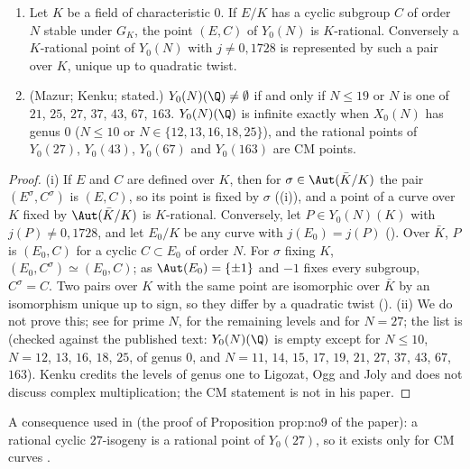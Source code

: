 \begin{proposition}\label{prop:moddeg:rational-points}
\leavevmode
\begin{enumerate}[label=(\roman*)]
\item Let $K$ be a field of characteristic $0$. If $E/K$ has a cyclic subgroup $C$ of order $N$ stable under $G_K$, the point $(E,C)$ of $Y_0(N)$ is
$K$-rational. Conversely a $K$-rational point of $Y_0(N)$ with $j\ne0,1728$ is represented by such a pair over $K$, unique up to quadratic twist.
\item (Mazur; Kenku; stated.) $Y_0(N)(\Q)\ne\emptyset$ if and only if $N\le19$ or $N$ is one of $21$, $25$, $27$, $37$, $43$, $67$, $163$. $Y_0(N)(\Q)$ is infinite exactly when $X_0(N)$
has genus $0$ ($N\le10$ or $N\in\{12,13,16,18,25\}$), and the rational points of $Y_0(27)$, $Y_0(43)$, $Y_0(67)$ and $Y_0(163)$ are CM points.
\end{enumerate}
\end{proposition}

\begin{proof}
(i) If $E$ and $C$ are defined over $K$, then for $\sigma\in\Aut(\bar K/K)$ the pair $(E^\sigma,C^\sigma)$ is $(E,C)$, so its point is fixed by $\sigma$
((i)), and a point of a curve over $K$ fixed by $\Aut(\bar K/K)$ is $K$-rational. Conversely, let $P\in Y_0(N)(K)$ with
$j(P)\ne0,1728$, and let $E_0/K$ be any curve with $j(E_0)=j(P)$ (). Over $\bar K$, $P$ is $(E_0,C)$ for a cyclic $C\subset E_0$ of order $N$.
For $\sigma$ fixing $K$, $(E_0,C^\sigma)\simeq(E_0,C)$; as $\Aut(E_0)=\{\pm1\}$ and $-1$ fixes every subgroup, $C^\sigma=C$. Two pairs over $K$ with the same point
are isomorphic over $\bar K$ by an isomorphism unique up to sign, so they differ by a quadratic twist (). (ii) We do not prove this; see
\cite{Mazur78} for prime $N$, \cite{Kenku79,Kenku80a,Kenku80b,Kenku81} for the remaining levels and \cite{Ligozat75} for $N=27$; the list is
\cite[Theorem 1]{Kenku} (checked against the published text: $Y_0(N)(\Q)$ is empty except for $N\le10$, $N=12$, $13$, $16$, $18$, $25$, of genus $0$, and $N=11$, $14$, $15$, $17$,
$19$, $21$, $27$, $37$, $43$, $67$, $163$). Kenku credits the levels of genus one to Ligozat, Ogg and Joly and does not discuss complex multiplication; the CM statement is not in
his paper.
\end{proof}

A consequence used in  (the proof of Proposition prop:no9 of the paper): a rational cyclic $27$-isogeny is a rational point of $Y_0(27)$, so
it exists only for CM curves \cite{Ligozat75}.

